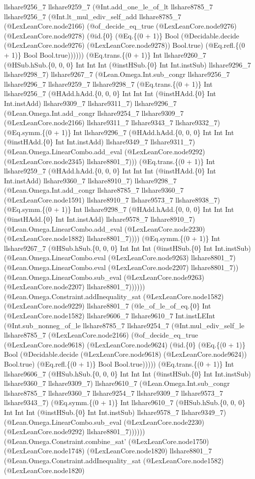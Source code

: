 \documentclass[11pt]{article}
\begin{document}
llshare9256\_7 llshare9259\_7 (@Int.add\_one\_le\_of\_lt llshare8785\_7 llshare9256\_7 (@Int.lt\_mul\_ediv\_self\_add llshare8785\_7 (@LexLeanCore.node2166) (@of\_decide\_eq\_true (@LexLeanCore.node9276) (@LexLeanCore.node9278) (@id.\{0\} (@Eq.\{(0 + 1)\} Bool (@Decidable.decide (@LexLeanCore.node9276) (@LexLeanCore.node9278)) Bool.true) (@Eq.refl.\{(0 + 1)\} Bool Bool.true)))))) (@Eq.trans.\{(0 + 1)\} Int llshare9260\_7 (@HSub.hSub.\{0, 0, 0\} Int Int Int (@instHSub.\{0\} Int Int.instSub) llshare9296\_7 llshare9298\_7) llshare9267\_7 (@Lean.Omega.Int.sub\_congr llshare9256\_7 llshare9296\_7 llshare9259\_7 llshare9298\_7 (@Eq.trans.\{(0 + 1)\} Int llshare9256\_7 (@HAdd.hAdd.\{0, 0, 0\} Int Int Int (@instHAdd.\{0\} Int Int.instAdd) llshare9309\_7 llshare9311\_7) llshare9296\_7 (@Lean.Omega.Int.add\_congr llshare9254\_7 llshare9309\_7 (@LexLeanCore.node2166) llshare9311\_7 llshare9343\_7 llshare9332\_7) (@Eq.symm.\{(0 + 1)\} Int llshare9296\_7 (@HAdd.hAdd.\{0, 0, 0\} Int Int Int (@instHAdd.\{0\} Int Int.instAdd) llshare9349\_7 llshare9311\_7) (@Lean.Omega.LinearCombo.add\_eval (@LexLeanCore.node9292) (@LexLeanCore.node2345) llshare8801\_7))) (@Eq.trans.\{(0 + 1)\} Int llshare9259\_7 (@HAdd.hAdd.\{0, 0, 0\} Int Int Int (@instHAdd.\{0\} Int Int.instAdd) llshare9360\_7 llshare8910\_7) llshare9298\_7 (@Lean.Omega.Int.add\_congr llshare8785\_7 llshare9360\_7 (@LexLeanCore.node1591) llshare8910\_7 llshare9573\_7 llshare8938\_7) (@Eq.symm.\{(0 + 1)\} Int llshare9298\_7 (@HAdd.hAdd.\{0, 0, 0\} Int Int Int (@instHAdd.\{0\} Int Int.instAdd) llshare9578\_7 llshare8910\_7) (@Lean.Omega.LinearCombo.add\_eval (@LexLeanCore.node2230) (@LexLeanCore.node1882) llshare8801\_7)))) (@Eq.symm.\{(0 + 1)\} Int llshare9267\_7 (@HSub.hSub.\{0, 0, 0\} Int Int Int (@instHSub.\{0\} Int Int.instSub) (@Lean.Omega.LinearCombo.eval (@LexLeanCore.node9263) llshare8801\_7) (@Lean.Omega.LinearCombo.eval (@LexLeanCore.node2207) llshare8801\_7)) (@Lean.Omega.LinearCombo.sub\_eval (@LexLeanCore.node9263) (@LexLeanCore.node2207) llshare8801\_7)))))) (@Lean.Omega.Constraint.addInequality\_sat (@LexLeanCore.node1582) (@LexLeanCore.node9229) llshare8801\_7 (@le\_of\_le\_of\_eq.\{0\} Int (@LexLeanCore.node1582) llshare9606\_7 llshare9610\_7 Int.instLEInt (@Int.sub\_nonneg\_of\_le llshare8785\_7 llshare9254\_7 (@Int.mul\_ediv\_self\_le llshare8785\_7 (@LexLeanCore.node2166) (@of\_decide\_eq\_true (@LexLeanCore.node9618) (@LexLeanCore.node9624) (@id.\{0\} (@Eq.\{(0 + 1)\} Bool (@Decidable.decide (@LexLeanCore.node9618) (@LexLeanCore.node9624)) Bool.true) (@Eq.refl.\{(0 + 1)\} Bool Bool.true))))) (@Eq.trans.\{(0 + 1)\} Int llshare9606\_7 (@HSub.hSub.\{0, 0, 0\} Int Int Int (@instHSub.\{0\} Int Int.instSub) llshare9360\_7 llshare9309\_7) llshare9610\_7 (@Lean.Omega.Int.sub\_congr llshare8785\_7 llshare9360\_7 llshare9254\_7 llshare9309\_7 llshare9573\_7 llshare9343\_7) (@Eq.symm.\{(0 + 1)\} Int llshare9610\_7 (@HSub.hSub.\{0, 0, 0\} Int Int Int (@instHSub.\{0\} Int Int.instSub) llshare9578\_7 llshare9349\_7) (@Lean.Omega.LinearCombo.sub\_eval (@LexLeanCore.node2230) (@LexLeanCore.node9292) llshare8801\_7)))))) (@Lean.Omega.Constraint.combine\_sat' (@LexLeanCore.node1750) (@LexLeanCore.node1748) (@LexLeanCore.node1820) llshare8801\_7 (@Lean.Omega.Constraint.addInequality\_sat (@LexLeanCore.node1582) (@LexLeanCore.node1820) 
\end{document}
